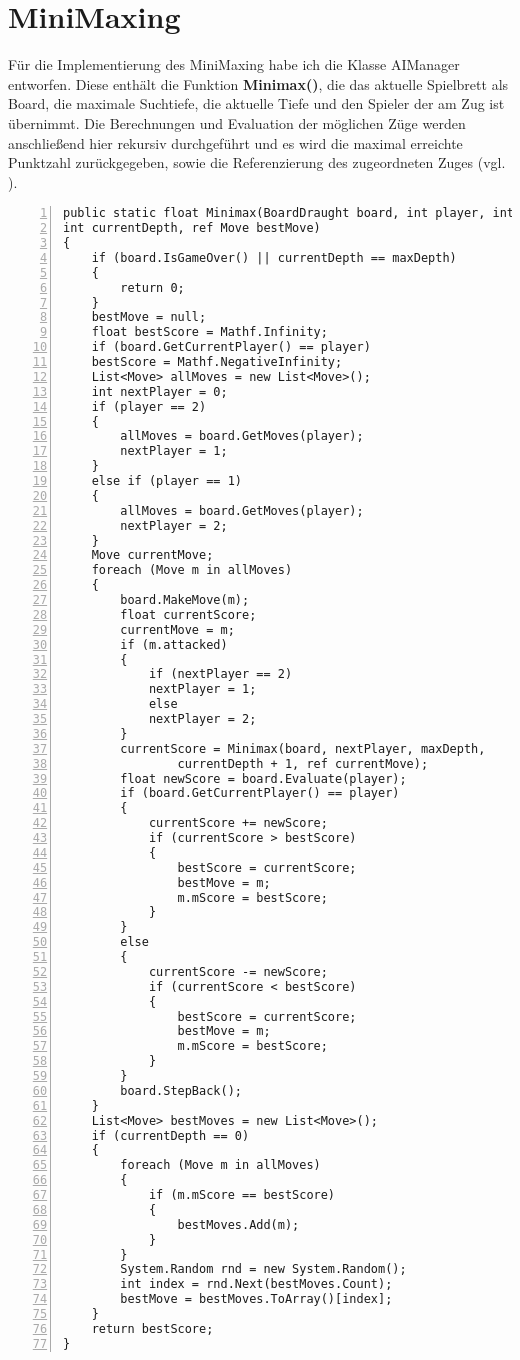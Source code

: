 \section{MiniMaxing}
\label{ch:Implementierung:sec:MiniMaxing}
Für die Implementierung des MiniMaxing habe ich die Klasse AIManager entworfen. Diese enthält die Funktion \textbf{Minimax()}, die das aktuelle Spielbrett als Board, die maximale Suchtiefe, die aktuelle Tiefe und den Spieler der am Zug ist übernimmt. Die Berechnungen und Evaluation der möglichen Züge werden anschließend hier rekursiv durchgeführt und es wird die maximal erreichte Punktzahl zurückgegeben, sowie die Referenzierung des zugeordneten Zuges (vgl. \cite{palacios2016unity}).\\

\begin{lstlisting}[basicstyle=\scriptsize\ttfamily, numbers=left, stepnumber=1, numberstyle = \tiny]
public static float Minimax(BoardDraught board, int player, int maxDepth,
int currentDepth, ref Move bestMove)
{
	if (board.IsGameOver() || currentDepth == maxDepth)
	{
		return 0;
	}
	bestMove = null;
	float bestScore = Mathf.Infinity;
	if (board.GetCurrentPlayer() == player)
	bestScore = Mathf.NegativeInfinity;
	List<Move> allMoves = new List<Move>();
	int nextPlayer = 0;
	if (player == 2)
	{
		allMoves = board.GetMoves(player);
		nextPlayer = 1;
	}
	else if (player == 1)
	{
		allMoves = board.GetMoves(player);
		nextPlayer = 2;
	}
	Move currentMove;
	foreach (Move m in allMoves)
	{
		board.MakeMove(m);
		float currentScore;
		currentMove = m;
		if (m.attacked)
		{
			if (nextPlayer == 2)
			nextPlayer = 1;
			else
			nextPlayer = 2;
		} 
		currentScore = Minimax(board, nextPlayer, maxDepth, 
				currentDepth + 1, ref currentMove);
		float newScore = board.Evaluate(player);
		if (board.GetCurrentPlayer() == player)
		{
			currentScore += newScore;
			if (currentScore > bestScore)
			{
				bestScore = currentScore;
				bestMove = m;
				m.mScore = bestScore;
			}
		}
		else
		{
			currentScore -= newScore;
			if (currentScore < bestScore)
			{
				bestScore = currentScore;
				bestMove = m;
				m.mScore = bestScore;
			}
		}
		board.StepBack();
	}
	List<Move> bestMoves = new List<Move>();
	if (currentDepth == 0)
	{
		foreach (Move m in allMoves)
		{
			if (m.mScore == bestScore)
			{
				bestMoves.Add(m);
			}
		}
		System.Random rnd = new System.Random();
		int index = rnd.Next(bestMoves.Count);
		bestMove = bestMoves.ToArray()[index];
	}
	return bestScore;
}
\end{lstlisting}


